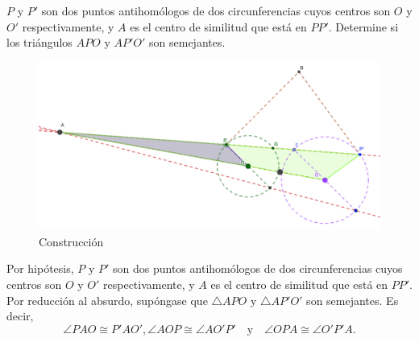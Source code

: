 \begin{problema}
	$P$ y $P'$ son dos puntos antihomólogos de dos circunferencias cuyos centros son $O$ y $O'$ respectivamente, y $A$ es el centro de similitud que está en $PP'$. Determine si los triángulos $APO$ y $AP'O'$ son semejantes.
	\begin{figure}[H]
		\centering
		\includegraphics[scale=0.3]{Images/3}
		\caption{Construcción}
	\end{figure}
\begin{dem}
	Por hipótesis, $P$ y $P'$ son dos puntos antihomólogos de dos circunferencias cuyos centros son $O$ y $O'$ respectivamente, y $A$ es el centro de similitud que está en $PP'$. Por reducción al absurdo, supóngase que $\triangle APO$ y $\triangle AP'O'$ son semejantes. Es decir, 
	$$\angle PAO \cong P'AO', \angle AOP\cong \angle AO'P' \quad \text{y} \quad\angle OPA\cong \angle O'P'A.$$
	

\end{dem}
\end{problema}
